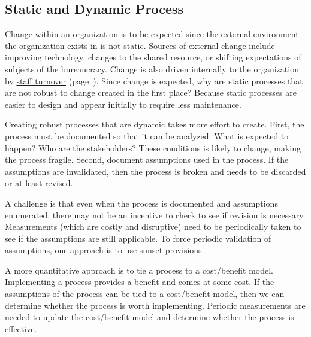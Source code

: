 \subsection*{Static and Dynamic Process\label{sec:static-dynamic-processes}}


Change within an \gls{organization} is to be expected since the external environment the organization exists in is not static. Sources of external change include improving technology,  changes to the \gls{shared resource}, or shifting expectations of subjects of the bureaucracy.
Change is also driven internally to the organization by \hyperref[sec:turnover]{staff turnover} 
(page~\pageref{sec:turnover}).
Since change is expected, why are static processes that are not robust to change created in the first place? Because static processes are easier to design and appear initially to require less maintenance.

Creating robust processes that are dynamic takes more effort to create. First, the process must be documented so that it can be analyzed. What is expected to happen? Who are the stakeholders? These conditions is likely to change, making the process fragile. Second, document assumptions used in the process. If the assumptions are invalidated, then the process is broken and needs to be discarded or at least revised. 

A challenge is that even when the process is documented and assumptions enumerated, there may not be an incentive to check to see if revision is necessary. Measurements (which are costly and disruptive) need to be periodically taken to see if the assumptions are still applicable. To force periodic validation of assumptions, one approach is to use \href{https://en.wikipedia.org/wiki/Sunset_provision}{sunset provisions}. 


A more quantitative approach is to tie a process to a cost/benefit model. Implementing a process provides a benefit and comes at some cost. If the assumptions of the process can be tied to a cost/benefit model, then we can determine whether the process is worth implementing. Periodic measurements are needed to update the cost/benefit model and determine whether the process is effective.

\ \\

